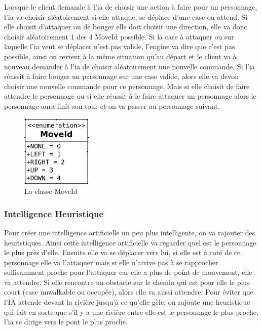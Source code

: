 \documentclass[a4paper,12pt]{article}
\begin{document}
Lorsque le client demande à l'ia de choisir une action à faire pour un personnage, l'ia va choisir aléatoirement si elle attaque, se déplace d'une case ou attend. Si elle choisit d'attaquer ou de bouger elle doit choisir une direction, elle va donc choisir aléatoirement 1 des 4 MoveId possible. Si la case à attaquer ou sur laquelle l'ia veut se déplacer n'est pas valide, l'engine va dire que c'est pas possible, ainsi on revient à la même situation qu'au départ et le client va à nouveau demander à l'ia de choisir aléatoirement une nouvelle commande.
Si l'ia réussit à faire bouger un personnage sur une case valide, alors elle va devoir choisir une nouvelle commande pour ce personnage. Mais si elle choisit de faire attendre le personnage ou si elle réussit à le faire attaquer un personnage alors le personnage aura finit son tour et on va passer au personnage suivant.
\begin{figure}[ht]
\begin{center}
\includegraphics[width=0.3\textwidth]{moveId.png}
\caption{\label{pacmangame}La classe MoveId}
\end{center}
\end{figure}
\newpage
\subsubsection{Intelligence Heuristique}

Pour créer une intelligence artificielle un peu plus intelligente, on va rajouter des heuristiques.
Ainsi cette intelligence artificielle va regarder quel est le personnage le plus près d'elle. Ensuite elle va se déplacer vers lui, si elle est à coté de ce personnage elle va l'attaquer mais si elle n'arrive pas à se rapprocher suffisamment proche pour l'attaquer car elle a plus de point de mouvement, elle va attendre.
Si elle rencontre un obstacle sur le chemin qui est pour elle le plus court (case unwalkable ou occupée), alors elle va aussi attendre.
Pour éviter que l'IA attende devant la rivière jusqu'à ce qu'elle gèle, on rajoute une heuristique qui fait en sorte que s'il y a une rivière entre elle est le personnage le plus proche, l'ia se dirige vers le pont le plus proche.
\end{document}
